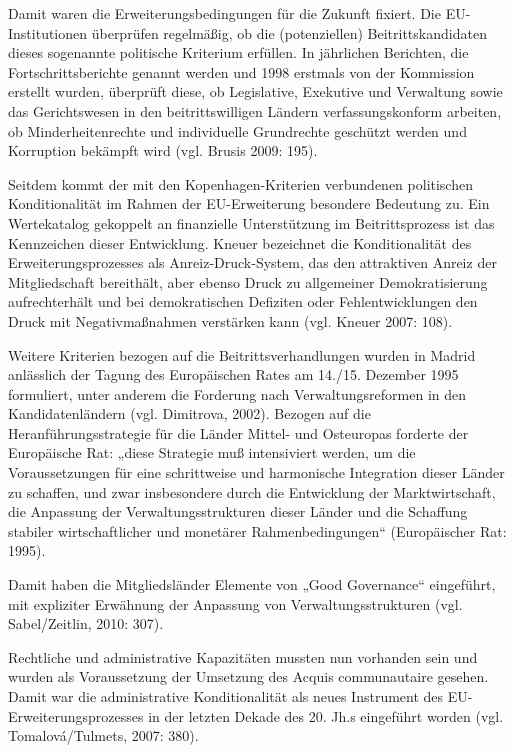 Damit waren die Erweiterungsbedingungen für die Zukunft fixiert. Die EU-Institutionen überprüfen regelmäßig, ob die (potenziellen) Beitrittskandidaten dieses sogenannte politische Kriterium erfüllen. In jährlichen Berichten, die Fortschrittsberichte genannt werden und 1998 erstmals von der Kommission erstellt wurden, überprüft diese, ob Legislative, Exekutive und Verwaltung sowie das Gerichtswesen in den beitrittswilligen Ländern verfassungskonform arbeiten, ob Minderheitenrechte und individuelle Grundrechte geschützt werden und Korruption bekämpft wird (vgl. Brusis 2009: 195).
\par
Seitdem kommt der mit den Kopenhagen-Kriterien verbundenen politischen Konditionalität im Rahmen der EU-Erweiterung besondere Bedeutung zu. Ein Wertekatalog gekoppelt an finanzielle Unterstützung im Beitrittsprozess ist das Kennzeichen dieser Entwicklung. Kneuer bezeichnet die Konditionalität des Erweiterungsprozesses als Anreiz-Druck-System, das den attraktiven Anreiz der Mitgliedschaft bereithält, aber ebenso Druck zu allgemeiner Demokratisierung aufrechterhält und bei demokratischen Defiziten oder Fehlentwicklungen den Druck mit Negativmaßnahmen verstärken kann (vgl. Kneuer 2007: 108).\par
Weitere Kriterien bezogen auf die Beitrittsverhandlungen wurden in Madrid anlässlich der Tagung des Europäischen Rates am 14./15. Dezember 1995 formuliert, unter anderem die Forderung nach Verwaltungsreformen in den Kandidatenländern (vgl. Dimitrova, 2002). Bezogen auf die Heranführungsstrategie für die Länder Mittel- und Osteuropas forderte der Europäische Rat:
„diese Strategie muß intensiviert werden, um die Voraussetzungen für eine schrittweise und harmonische Integration dieser Länder zu schaffen, und zwar insbesondere durch die Entwicklung der Marktwirtschaft, die Anpassung der Verwaltungsstrukturen dieser Länder und die Schaffung stabiler wirtschaftlicher und monetärer Rahmenbedingungen“ (Europäischer Rat: 1995).\par
Damit haben die Mitgliedsländer Elemente von „Good Governance“ eingeführt, mit expliziter Erwähnung der Anpassung von Verwaltungsstrukturen (vgl. Sabel/Zeitlin, 2010: 307).\par
Rechtliche und administrative Kapazitäten mussten nun vorhanden sein und wurden als Voraussetzung der Umsetzung des Acquis communautaire gesehen. Damit war die administrative Konditionalität als neues Instrument des EU-Erweiterungsprozesses in der letzten Dekade des 20. Jh.s eingeführt worden (vgl. Tomalová/Tulmets, 2007: 380).\par
